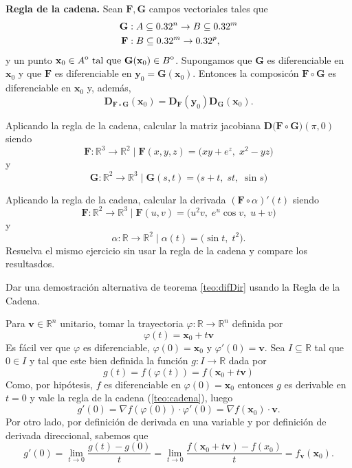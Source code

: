 
\begin{theorem}\textbf{Regla de la cadena.} \label{teo:cadena}  Sean $\mathbf{F}, \mathbf{G}$ campos vectoriales tales que
    \begin{align*}
    \mathbf{G} &:A  \subseteq  0.32^n \to B  \subseteq  0.32^m \\
    \mathbf{F} &:B  \subseteq  0.32^m \to 0.32^p,
    \end{align*}
  y un punto $\mathbf{x}_0 \in {\kern0ptA}^{\mathrm{o}} \text{ tal que } \mathbf{G}(\mathbf{x}_0) \in {\kern0ptB}^{\mathrm{o}}$. Supongamos que $\mathbf{G}$ es diferenciable en $\mathbf{x}_0$ y que $\mathbf{F}$ es diferenciable en $\mathbf{y}_0 = \mathbf{G}(\mathbf{x}_0)$. Entonces la composic\'on $\mathbf{F} \circ \mathbf{G}$ es diferenciable en $\mathbf{x}_0$ y, adem\'as,
  \[
   \boldsymbol{D}_{\mathbf{F} \circ \mathbf{G}}{(\mathbf{x}_0)} = \boldsymbol{D}_\mathbf{F}{(\mathbf{y}_0)} 
   \boldsymbol{D}_\mathbf{G}{(\mathbf{x}_0)}.
  \]
\end{theorem}




\begin{tarea} Aplicando la regla de la cadena, calcular la matriz jacobiana  $\boldsymbol{D} \big(  \mathbf{F}  \circ \mathbf{G} \big)(\pi,0)$ siendo
$$  \mathbf{F}:\mathbb{R}^3\to\mathbb{R}^2 \mid  \mathbf{F}(x,y,z)=\big( xy + e^{z},\; x^{2}-yz \big)$$ y $$ \mathbf{G}:\mathbb{R}^2\to\mathbb{R}^3 \mid  \mathbf{G}(s,t)=\big( s+t,\; st,\; \sin s \big)$$
\end{tarea}




\begin{tarea}  Aplicando la regla de la cadena, calcular  la derivada $(\mathbf{F} \circ \alpha)'(t)$ siendo 
  $$\mathbf{F}:\mathbb{R}^2 \to \mathbb{R}^3 \mid  \mathbf{F}(u,v) = \big(u^2v,\; e^u \cos v,\; u+v\big)$$  y   $$\alpha:\mathbb{R} \to \mathbb{R}^2 \mid 
\alpha(t) = \big(\sin t,\; t^2\big).$$ 
Resuelva el mismo ejercicio sin usar  la regla de la cadena y compare los resultasdos. 
\end{tarea}

\begin{tarea} Dar una demostraci\'on alternativa de teorema \ref{teo:difDir} usando la Regla de la Cadena. 
\end{tarea} Para $\mathbf{v} \in\mathbb{R}^n$ unitario, tomar la trayectoria $\varphi:\mathbb{R}\to\mathbb{R}^n$  definida por 
$$
\varphi(t) = \mathbf{x}_0  + t\mathbf{v}
$$
 Es f\'acil ver que $\varphi$  es diferenciable,  $\varphi(0)=\mathbf{x}_0$  y  $\varphi'(0)=\mathbf{v}$.   Sea  $I \subseteq \mathbb{R}$ tal que $0\in I$ y tal que este bien definida la funci\'on  $g: I \to\mathbb{R}$ dada por 
$$g(t) = f(\varphi(t)) = f(\mathbf{x}_0+t\mathbf{v})$$
Como, por hip\'otesis,  $f$ es diferenciable en $\varphi(0)=\mathbf{x}_0$ entonces $g$ es derivable en $t=0$ y vale la regla de la cadena (\ref{teo:cadena}), luego
$$g'(0) = \nabla f(\varphi(0)) \cdot \varphi'(0) =  \nabla f(\mathbf{x}_0)\cdot \mathbf{v}.$$
Por otro lado, por definición de derivada en una variable y  por definición de derivada direccional, sabemos que
\[
g'(0) = \lim_{t \to 0}\frac{g(t)-g(0)}{t}= \lim_{t \to 0}\frac{f(\mathbf{x}_0 +t \mathbf{v})-f(x_0)}{t} =  f_{\mathbf{v}}(\mathbf{x}_0).
\]

 